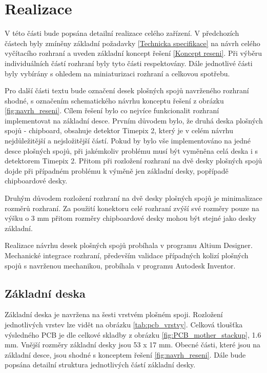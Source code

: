 \chapter{Realizace}
\label{realizace}
V této části bude popsána detailní realizace celého zařízení. V předchozích částech byly zmíněny základní požadavky \ref{Technicka specifikace} na návrh celého vyčítacího rozhraní a uveden základní koncept řešení \ref{Koncept reseni}. Při výběru individuálních částí rozhraní byly tyto části respektovány. Dále jednotlivé části byly vybírány s ohledem na miniaturizaci rozhraní a celkovou spotřebu. 

\par Pro další části textu bude označení desek plošných spojů navrženého rozhraní shodné, s označením schematického návrhu konceptu řešení z obrázku \ref{fig:navrh_reseni}. Cílem řešení bylo co nejvíce funkcionalit rozhraní implementovat na základní desce. Prvním důvodem bylo, že druhá deska plošných spojů - chipboard, obsahuje detektor Timepix 2, který je v celém návrhu nejdůležitější a nejsložitější částí. Pokud by bylo vše implementováno na jedné desce plošných spojů, při jakémkoliv problému musí být vyměněna celá deska i s detektorem Timepix 2. Přitom při rozložení rozhraní na dvě desky plošných spojů dojde při případném problému k výměně jen základní desky, popřípadě chipboardové desky. 
\par Druhým důvodem rozložení rozhraní na dvě desky plošných spojů je minimalizace rozměrů rozhraní. Za použití konektoru celé rozhraní zvýší své rozměry pouze na výšku o 3 mm přitom rozměry chipboardové desky mohou být stejné jako desky základní.

\par Realizace návrhu desek plošných spojů probíhala v programu Altium Designer. Mechanické integrace rozhraní, především validace případných kolizí plošných spojů s navrženou mechanikou, probíhala v programu Autodesk Inventor.

\section{Základní deska}	
	\label{zakladni deska}
	Základní deska je navržena na šesti vrstvém plošném spoji. Rozložení jednotlivých vrstev lze vidět na obrázku \ref{tab:pcb_vrstvy}. Celková tloušťka výsledného PCB je dle celkové skladby z obrázku \ref{fig:PCB_mother_stackup}, 1.6 mm. Vnější rozměry základní desky jsou 53 x 17 mm. Obecné části, které jsou na základní desce, jsou shodné s konceptem řešení \ref{fig:navrh_reseni}. Dále bude popsána detailní struktura jednotlivých částí základní desky.

